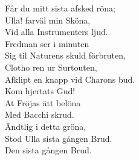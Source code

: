 Får du mitt sista afsked röna;\\ 
Ulla! farväl min Sköna,\\ 
Vid alla Instrumenters ljud.\\ 
Fredman ser i minuten\\ 
Sig til Naturens skuld förbruten,\\ 
Clotho ren ur Surtouten,\\ 
Afklipt en knapp vid Charons bud.\\ 
Kom hjertats Gud!\\ 
At Fröjas ätt belöna\\ 
Med Bacchi skrud.\\ 
Ändtlig i detta gröna,\\ 
Stod Ulla sista gången Brud.\\ 
Den sista gången Brud.
